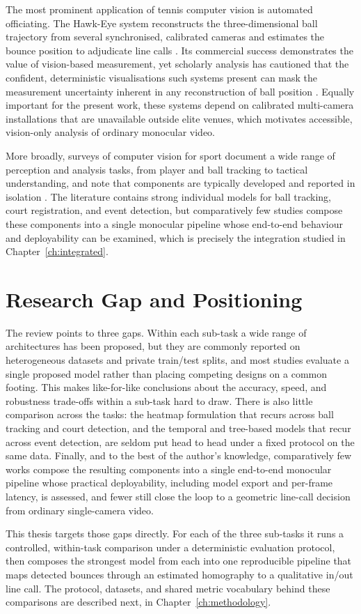 The most prominent application of tennis computer vision is automated
officiating. The Hawk-Eye system reconstructs the three-dimensional ball
trajectory from several synchronised, calibrated cameras and estimates the
bounce position to adjudicate line calls \cite{owens2003hawkeye}. Its
commercial success demonstrates the value of vision-based measurement, yet
scholarly analysis has cautioned that the confident, deterministic
visualisations such systems present can mask the measurement uncertainty
inherent in any reconstruction of ball position \cite{collins2008hawkeye}.
Equally important for the present work, these systems depend on calibrated
multi-camera installations that are unavailable outside elite venues, which
motivates accessible, vision-only analysis of ordinary monocular video.

More broadly, surveys of computer vision for sport document a wide range of
perception and analysis tasks, from player and ball tracking to tactical
understanding, and note that components are typically developed and reported in
isolation \cite{thomas2017cvsports, zhao2023sportssurvey}. The literature
contains strong individual models for ball tracking, court registration, and
event detection, but comparatively few studies compose these components into a
single monocular pipeline whose end-to-end behaviour and deployability can be
examined, which is precisely the integration studied in
Chapter~\ref{ch:integrated}.

\section{Research Gap and Positioning}
\label{sec:rw-gap}

The review points to three gaps. Within each sub-task a wide range of
architectures has been proposed, but they are commonly reported on
heterogeneous datasets and private train/test splits, and most studies
evaluate a single proposed model rather than placing competing designs on a
common footing. This makes like-for-like conclusions about the accuracy,
speed, and robustness trade-offs within a sub-task hard to draw. There is also
little comparison across the tasks: the heatmap formulation that recurs across
ball tracking and court detection, and the temporal and tree-based models that
recur across event detection, are seldom put head to head under a fixed
protocol on the same data. Finally, and to the best of the author's knowledge,
comparatively few works compose the resulting components into a single
end-to-end monocular pipeline whose practical deployability, including model
export and per-frame latency, is assessed, and fewer still close the loop to a
geometric line-call decision from ordinary single-camera video.

This thesis targets those gaps directly. For each of the three sub-tasks it
runs a controlled, within-task comparison under a deterministic evaluation
protocol, then composes the strongest model from each into one reproducible
pipeline that maps detected bounces through an estimated homography to a
qualitative in/out line call. The protocol, datasets, and shared metric
vocabulary behind these comparisons are described next, in
Chapter~\ref{ch:methodology}.
